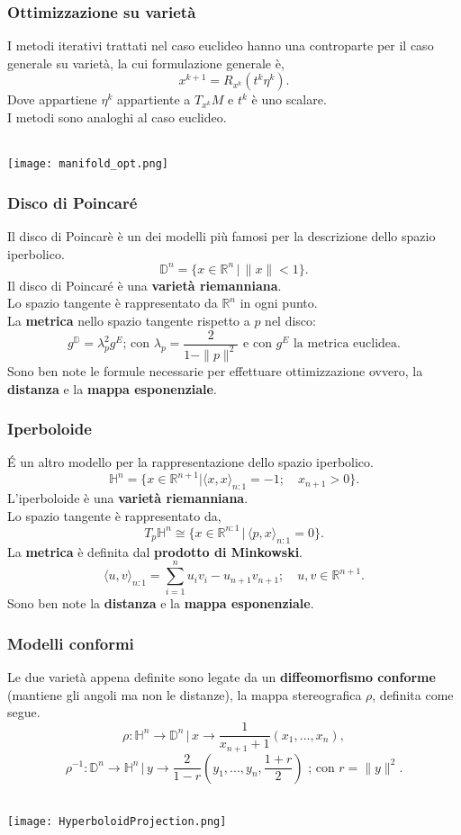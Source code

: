 \documentclass{beamer}
\begin{document}
\begin{frame}
\frametitle{Ottimizzazione su varietà}
I metodi iterativi trattati nel caso euclideo hanno una controparte per il caso generale su varietà, la cui formulazione generale è,\\
\[x^{k+1} = R_{x^k}(t^k \eta^k).\]
Dove  appartiene $\eta^k$ appartiente a $T_{x^k}M$ e $t^k$ è uno scalare.\\
I metodi sono analoghi al caso euclideo.\\~\
\begin{center}
    \texttt{[image: manifold\_opt.png]} 
\end{center}
\end{frame}

\begin{frame}
\frametitle{Disco di Poincaré}
Il disco di Poincarè è un dei modelli più famosi per la descrizione dello spazio iperbolico.\\
\[ \mathbb{D}^n = \{x \in \mathbb{R}^n \, | \, \| x \| < 1\}. \]
Il disco di Poincaré è una \textbf{varietà riemanniana}.\\
Lo spazio tangente è rappresentato da $\mathbb{R}^n$ in ogni punto.\\
La \textbf{metrica} nello spazio tangente rispetto a $p$ nel disco:
\[ g^\mathbb{D} = \lambda_p^2 g^E \mbox{; con } \lambda_p = \frac{2}{1- \| p \|^2} \mbox{ e con } g^E \mbox{ la metrica euclidea}. \]
Sono ben note le formule necessarie per effettuare ottimizzazione ovvero, la \textbf{distanza} e la \textbf{mappa esponenziale}.
\end{frame}

\begin{frame}
\frametitle{Iperboloide}
\'E un altro modello per la rappresentazione dello spazio iperbolico.
\[\mathbb{H}^n = \{x \in \mathbb{R}^{n+1} | \langle x, x \rangle_{n:1} = -1; \quad x_{n+1} > 0 \}.\]
L’iperboloide è una \textbf{varietà riemanniana}.\\
Lo spazio tangente è rappresentato da,
\[T_p\mathbb{H}^n \cong \{x \in \mathbb{R}^{n:1} \, | \, \langle p,x \rangle_{n:1} = 0\}.\]
La \textbf{metrica} è definita dal \textbf{prodotto di Minkowski}.
\[\langle u, v \rangle_{n:1} = \sum_{i=1}^{n} u_iv_i - u_{n+1}v_{n+1}; \quad u,v \in \mathbb{R}^{n+1}.\]
Sono ben note la \textbf{distanza} e la \textbf{mappa esponenziale}.
\end{frame}

\begin{frame}
\frametitle{Modelli conformi}
Le due varietà appena definite sono legate da un \textbf{diffeomorfismo conforme} (mantiene gli angoli ma non le distanze), la mappa stereografica $\rho$, definita come segue.
\[\rho : \mathbb{H}^n \to \mathbb{D}^n \, | \, x \to \frac{1}{x_{n+1} + 1}(x_1, ..., x_n),\]
\[\rho^{-1} : \mathbb{D}^n \to \mathbb{H}^n \, | \, y \to \frac{2}{1 - r}(y_1, ..., y_n, \frac{1+r}{2}) \mbox{ ; con } r = \| y \|^2.\]\\
\begin{center}
    \texttt{[image: HyperboloidProjection.png]} 
\end{center}
\end{frame}
\end{document}
